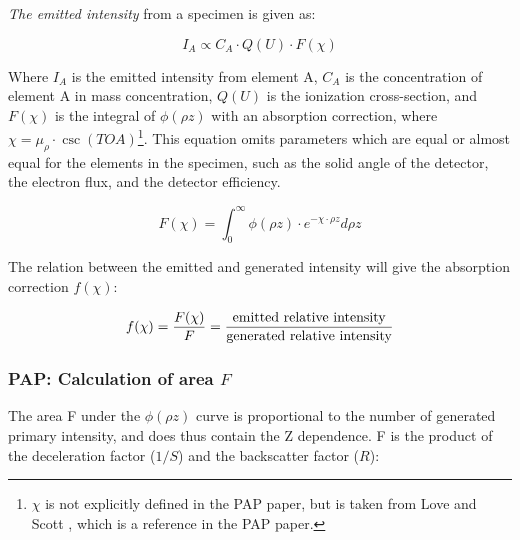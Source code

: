 \emph{The emitted intensity} from a specimen is given as:

\begin{equation}
    \label{eq:theory:quantitative:pap:general_principle:I_A}
    I_A \propto C_A \cdot Q(U) \cdot F(\chi)
\end{equation}

Where $I_A$ is the emitted intensity from element A, $C_A$ is the concentration of element A in mass concentration, $Q(U)$ is the ionization cross-section, and $F(\chi)$ is the integral of $\phi(\rho z)$ with an absorption correction, where $ \chi = \mu_\rho \cdot \csc(TOA)$\footnote{$\chi$ is not explicitly defined in the PAP paper, but is taken from Love and Scott \cite[Eq. (1)]{love_scott_1990}, which is a reference in the PAP paper.}.
This equation omits parameters which are equal or almost equal for the elements in the specimen, such as the solid angle of the detector, the electron flux, and the detector efficiency.


\begin{equation}
    \label{eq:theory:quantitative:pap:general_principle:f_of_chi}
    F(\chi) = \int_0^\infty \phi(\rho z) \cdot e^{-\chi \cdot \rho z} d\rho z
\end{equation}


The relation between the emitted and generated intensity will give the absorption correction $f(\chi)$:

\begin{equation}
    \label{eq:theory:quantitative:pap:general_principle:f_absorption_correction}
    f(\chi) = \frac{F(\chi)}{F} = \frac{\textnormal{emitted relative intensity}}{\textnormal{generated relative intensity}}
\end{equation}















\subsubsection{PAP: Calculation of area $F$}
\label{theory:quantitative:pap:calculation_of_F}

The area F under the $\phi(\rho z)$ curve is proportional to the number of generated primary intensity, and does thus contain the Z dependence.
F is the product of the deceleration factor ($1/S$) and the backscatter factor ($R$):

